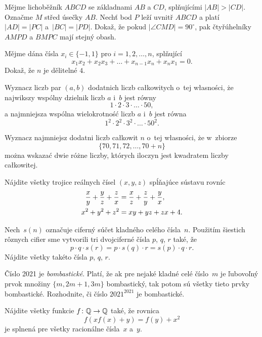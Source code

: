 {%
Mějme lichoběžník $ABCD$ se základnami $AB$ a $CD$, splňujícími $|AB|>|CD|$. Označme $M$ střed úsečky $AB$. Nechť bod $P$ leží uvnitř $ABCD$ a platí $|AD|=|PC|$ a~$|BC|=|PD|$. Dokaž, že pokud $|\angle CMD|=90^\circ$, pak čtyřúhelníky $AMPD$ a $BMPC$ mají stejný obash.}

{%
Mějme dána čísla $x_i \in \{-1, 1\}$ pro $i = 1, 2, \ldots, n$, splňující
$$
x_1x_2+x_2x_3+\ldots+x_{n-1}x_n+x_nx_1=0.
$$
Dokaž, že $n$ je dělitelné $4$.}

{%
Wyznacz liczb\ę{} par $(a,b)$ dodatnich liczb ca\l{}kowitych o~tej w\l{}asności, że najwi\ę{}kszy wspólny dzielnik liczb $a$ i~$b$ jest równy
$$
1\cdot 2\cdot 3\cdot\ldots\cdot 50,
$$
a najmniejsza wspólna wielokrotność liczb $a$ i~$b$ jest równa
$$
1^2\cdot 2^2\cdot 3^2\cdot\ldots\cdot 50^2.
$$
}

{%
Wyznacz najmniejsz\ą{} dodatni\ą{} liczb\ę{} ca\l{}kowit\ą{} $n$ o~tej w\l{}asności, że w~zbiorze
$$
\{70, 71, 72, \ldots, 70 + n\}
$$
można wskazać dwie różne liczby, których iloczyn jest kwadratem liczby ca\l{}kowitej.}

{%
Nájdite všetky trojice reálnych čísel $(x,y,z)$ spĺňajúce sústavu rovníc
$$
\aligned
\frac{x}{y}+\frac{y}{z}+\frac{z}{x}&=\frac{x}{z}+\frac{z}{y}+\frac{y}{x},\\
x^2+y^2+z^2&=xy+yz+zx+4.
\endaligned
$$
}

{%
Nech~$s(n)$ označuje ciferný súčet kladného celého čísla~$n$. Použitím šiestich rôznych cifier sme vytvorili tri dvojciferné čísla $p$, $q$, $r$ také, že
$$
p\cdot q \cdot s(r) = p\cdot s(q)\cdot r = s(p)\cdot q\cdot r.
$$
Nájdite všetky takéto čísla $p$, $q$, $r$.
}

{%
Číslo 2021 je \emph{bombastické}. Platí, že ak pre nejaké kladné celé číslo~$m$ je ľubovoľný prvok množiny $\{m,2m+1,3m\}$ bombastický, tak potom sú všetky tieto prvky bombastické. Rozhodnite, či číslo $2021^{2021}$ je bombastické.
}

{%
Nájdite všetky funkcie $f\colon\Bbb{Q}\to\Bbb{Q}$ také, že rovnica
$$
f(xf(x)+y)=f(y)+x^2
$$
je splnená pre všetky racionálne čísla~$x$ a~$y$.
}

